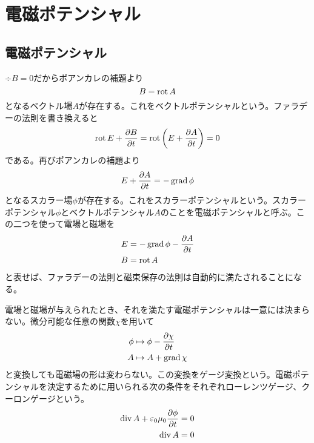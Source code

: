 \section{電磁ポテンシャル}

\subsection{電磁ポテンシャル}
    $\div B = 0$だからポアンカレの補題より
        \[B = \operatorname{rot} A\]
    となるベクトル場$A$が存在する。これをベクトルポテンシャルという。ファラデーの法則を書き換えると
        \[\operatorname{rot} E + \pdv{B}{t} = \operatorname{rot}\left(E + \pdv{A}{t}\right) = 0\]
    である。再びポアンカレの補題より
        \[E + \pdv{A}{t} = -\operatorname{grad}\phi\]
    となるスカラー場$\phi$が存在する。これをスカラーポテンシャルという。スカラーポテンシャル$\phi$とベクトルポテンシャル$A$のことを電磁ポテンシャルと呼ぶ。この二つを使って電場と磁場を
    \begin{align*}
        E &= -\operatorname{grad} \phi - \pdv{A}{t}\\
        B &= \operatorname{rot} A
    \end{align*}
    と表せば、ファラデーの法則と磁束保存の法則は自動的に満たされることになる。

    電場と磁場が与えられたとき、それを満たす電磁ポテンシャルは一意には決まらない。微分可能な任意の関数$\chi$を用いて
    \begin{align*}
        \phi &\mapsto \phi - \pdv{\chi}{t}\\
        A &\mapsto A + \operatorname{grad}\chi
    \end{align*}
    と変換しても電磁場の形は変わらない。この変換をゲージ変換という。電磁ポテンシャルを決定するために用いられる次の条件をそれぞれローレンツゲージ、クーロンゲージという。
    \begin{align*}
        \operatorname{div} A + \varepsilon_0\mu_0\pdv{\phi}{t} &= 0\\
        \operatorname{div} A &= 0
    \end{align*}

